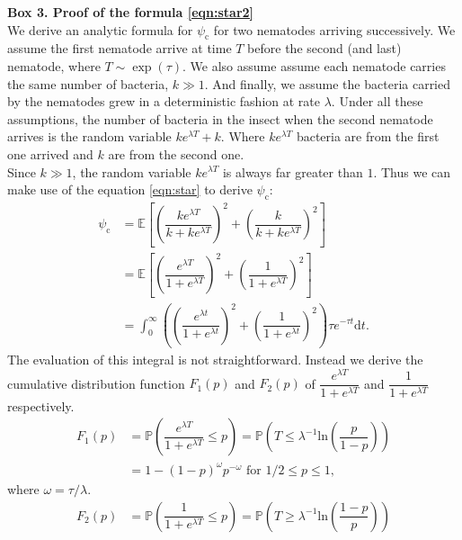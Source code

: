 \documentclass[10pt]{article}
\newcommand{\ud}{{\mathrm{d}}}
\newcommand{\pr}{{\mathbb{P}}}
\newcommand{\psic}{\psi_\mathrm{c}}
\begin{document}
\begin{boxframe}
\label{box_psi_consecutive}
\begin{multicols}{2}
\textbf{Box 3. Proof of  the formula \eqref{eqn:star2}\\}
We derive an analytic formula for $\psic$ for two nematodes arriving successively. 
We assume the first nematode arrive at time $T$ before the second (and last) nematode, where $T\sim \exp ( \tau)$. 
We also assume assume each nematode carries the same number of bacteria, $k \gg 1$. 
And finally, we assume the bacteria carried by the nematodes grew in a deterministic fashion at rate $\lambda$. 
Under all these assumptions, the number of bacteria in the insect when the second nematode arrives is the random variable $k e^{\lambda  T}+k$. 
Where $k e^{\lambda  T}$ bacteria are from the first one arrived and $k$ are from the second one.\\ 
  Since $k \gg 1$, the random variable $k e^{\lambda  T} $ is always far greater than $1$. 
  Thus we can make use of the equation \eqref{eqn:star} to derive $\psic$:
  \begin{align}
  \psic  &=\mathbb{E} \left[ \left( \dfrac{ k e^{\lambda T}}{k+ke^{\lambda T}} \right)^2+\left( \dfrac{k}{k+ke^{\lambda T}} \right)^2 \right] \\
  &=\mathbb{E} \left[ \left( \dfrac{ e^{\lambda T}}{1+e^{\lambda T}} \right)^2+\left( \dfrac{1}{1+e^{\lambda T}} \right)^2 \right] \\
  &=\int_0^\infty \left( \left( \dfrac{ e^{\lambda t}}{1+e^{\lambda t}} \right)^2 + \left( \dfrac{1}{1+e^{\lambda t}} \right)^2 \right) \tau e^{ -\tau t } \ud t.
  \end{align}
  The evaluation of this integral is not straightforward. 
  Instead we derive the cumulative distribution function $F_1(p)$ and $F_2(p)$ of $\dfrac{ e^{\lambda T}}{1+e^{\lambda T}}$ and $\dfrac{ 1}{1+e^{\lambda T}}$ respectively.
  \begin{align}
  F_1(p) &= \pr \left(\dfrac{e^{\lambda T}}{1+e^{\lambda T}} \leq p\right)= \pr \left(T \leq \lambda^{-1} \mathrm{ln}\left( \dfrac{p}{1-p} \right) \right) \nonumber \\
  &= 1-(1-p)^{\omega} p^{-\omega} \text{ for } 1/2 \leq p \leq 1,
  \end{align} 
  where $\omega=\tau / \lambda$.
  \begin{align}
  F_2(p) &= \pr \left(\dfrac{1}{1+e^{\lambda T}} \leq p\right) = \pr \left(T \geq \lambda^{-1} \mathrm{ln}\left( \dfrac{1-p}{p} \right) \right) \nonumber \\

\end{align}
\end{multicols}
\end{boxframe}
\end{document}
